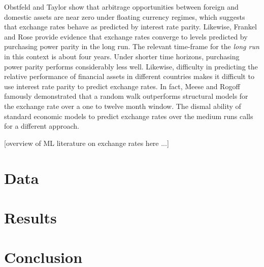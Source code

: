 \documentclass{sig-alternate-05-2015}
\begin{document}
\par{} Obstfeld and Taylor show that arbitrage opportunities between foreign and domestic assets are near zero under floating currency regimes, which suggests that exchange rates behave as predicted by interest rate parity. Likewise, Frankel and Rose provide evidence that exchange rates converge to levels predicted by purchasing power parity in the long run. The relevant time-frame for the \emph{long run} in this context is about four years. Under shorter time horizons, purchasing power parity performs considerably less well. Likewise, difficulty in predicting the relative performance of financial assets in different countries makes it difficult to use interest rate parity to predict exchange rates. In fact, Meese and Rogoff famously demonstrated that a random walk outperforms structural models for the exchange rate over a one to twelve month window. The dismal ability of standard economic models to predict exchange rates over the medium runs calls for a different approach.
\par{} [overview of ML literature on exchange rates here ...]

\section{Data}

\section{Results}

\section{Conclusion}
     
\newenvironment{hangref}{\begin{list}{}{\setlength{\itemsep}{0pt}
\setlength{\parsep}{0pt}\setlength{\rightmargin}{0pt}
\setlength{\leftmargin}{+\parindent}
\setlength{\itemindent}{-\parindent}}}{\end{list}}
\end{document}
